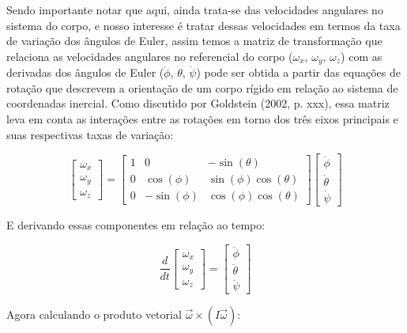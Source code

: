 Sendo importante notar que aqui, ainda trata-se das velocidades angulares no sistema do corpo, e nosso interesse é tratar dessas velocidades em termos da taxa de variação dos ângulos de Euler, assim temos a matriz de transformação que relaciona as velocidades angulares no referencial do corpo (\(\omega_x\), \(\omega_y\), \(\omega_z\)) com as derivadas dos ângulos de Euler (\(\dot{\phi}\), \(\dot{\theta}\), \(\dot{\psi}\)) pode ser obtida a partir das equações de rotação que descrevem a orientação de um corpo rígido em relação ao sistema de coordenadas inercial. Como discutido por Goldstein (2002, p. xxx), essa matriz leva em conta as interações entre as rotações em torno dos três eixos principais e suas respectivas taxas de variação:

\begin{equation}
\begin{bmatrix}
\omega_x \\
\omega_y \\
\omega_z
\end{bmatrix}
=
\begin{bmatrix}
1 & 0 & -\sin(\theta) \\
0 & \cos(\phi) & \sin(\phi)\cos(\theta) \\
0 & -\sin(\phi) & \cos(\phi)\cos(\theta)
\end{bmatrix}
\begin{bmatrix}
\dot{\phi} \\
\dot{\theta} \\
\dot{\psi}
\end{bmatrix}
\end{equation}

E derivando essas componentes em relação ao tempo:

\begin{equation}
	\frac{d}{dt}
	\begin{bmatrix}
	\omega_x \\
	\omega_y \\
	\omega_z
	\end{bmatrix}
	=
	\begin{bmatrix}
	\ddot{\phi} \\
	\ddot{\theta} \\
	\ddot{\psi}
	\end{bmatrix}
	\end{equation}

Agora calculando o produto vetorial $\vec{\omega} \times (I \vec{\omega})$:

